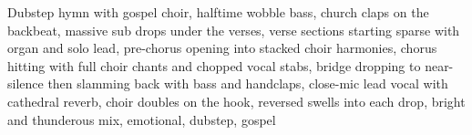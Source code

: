 
\begin{notes}

\end{notes}
\begin{style}
Dubstep hymn with gospel choir, halftime wobble bass, church claps on the backbeat, massive sub drops under the verses, verse sections starting sparse with organ and solo lead, pre-chorus opening into stacked choir harmonies, chorus hitting with full choir chants and chopped vocal stabs, bridge dropping to near-silence then slamming back with bass and handclaps, close-mic lead vocal with cathedral reverb, choir doubles on the hook, reversed swells into each drop, bright and thunderous mix, emotional, dubstep, gospel
\end{style}
